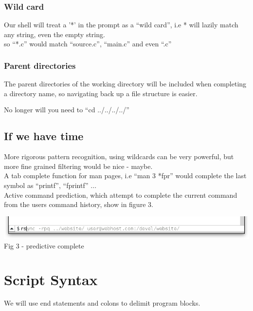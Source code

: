 \documentclass[a4paper,12pt]{article}
\begin{document}
\subsubsection*{Wild card}
Our shell will treat a '*' in the prompt as a ``wild card'', i.e * will lazily match any string, even the empty string. \\
so ``*.c'' would match ``source.c'', ``main.c'' and even ``.c''

\subsubsection*{Parent directories}

The parent directories of the working directory will be included when completing a directory name, so navigating back up a file structure is easier.

No longer will you need to ``cd ../../../../''

\subsection*{If we have time}
More rigorous pattern recognition, using wildcards can be very powerful, but more fine grained filtering would be nice - maybe.\\[0.5cm]
A tab complete function for man pages, i.e ``man 3 *fpr'' would complete the last symbol as ``printf'',  ``fprintf'' ...\\[0.5cm]
Active command prediction, which attempt to complete the current command from the users command history, show in figure 3. 

\begin{center}
  \includegraphics[width=14cm]{autocomplete.png}\\
  \small Fig 3 - predictive complete
\end{center}

\pagebreak
\section*{Script Syntax}

We will use end statements and colons to delimit program blocks.
\end{document}
